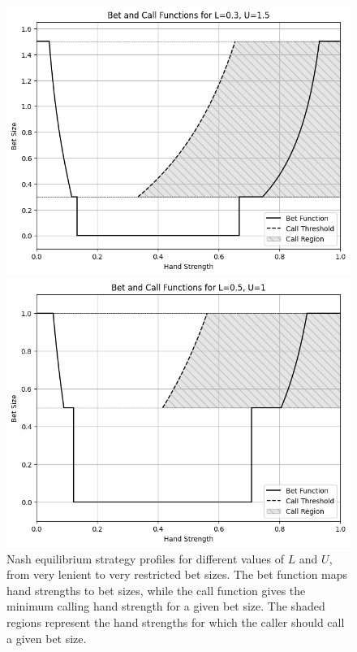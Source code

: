 \documentclass[a4paper,12pt]{article}
\theoremstyle{plain}
\theoremstyle{definition}
\begin{document}
\begin{figure}[h!]
\begin{adjustwidth}{-1in}{-1in}
        \vspace{0.5cm}\\
        \begin{minipage}{0.6\textwidth}
            \centering
            \includegraphics[width=\textwidth]{limit_continuous_0.3_1.5.png}
        \end{minipage}
        \hspace{0.05\textwidth}
        \begin{minipage}{0.6\textwidth}
            \centering
            \includegraphics[width=\textwidth]{limit_continuous_0.5_1.png}
        \end{minipage}
    \end{adjustwidth}
    \caption{Nash equilibrium strategy profiles for different values of $L$ and $U$, from very lenient to very restricted bet sizes. The bet function maps hand strengths to bet sizes, while the call function gives the minimum calling hand strength for a given bet size. The shaded regions represent the hand strengths for which the caller should call a given bet size.}
    \label{fig:strategyprofile}
\end{figure}
\end{document}

